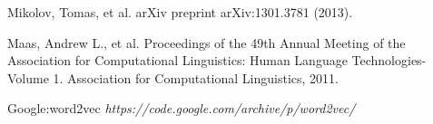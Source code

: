 \begin{thebibliography}{99} %
		
		Mikolov, Tomas, et al.  
		\newblock arXiv preprint arXiv:1301.3781 (2013).
		
		Maas, Andrew L., et al.
		\newblock Proceedings of the 49th Annual Meeting of the Association for Computational Linguistics: Human Language Technologies-Volume 1. Association for Computational Linguistics, 2011.
		
		Google:word2vec {\em https://code.google.com/archive/p/word2vec/} 
\end{thebibliography}